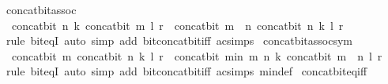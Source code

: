 \begin{isabellebody}
\isanewline
%
\endisadelimproof
\isanewline
{}\isamarkupfalse%
\ concat{\isacharunderscore}{\kern0pt}bit{\isacharunderscore}{\kern0pt}assoc{\isacharcolon}{\kern0pt}\isanewline
\ \ {\isacartoucheopen}concat{\isacharunderscore}{\kern0pt}bit\ n\ k\ {\isacharparenleft}{\kern0pt}concat{\isacharunderscore}{\kern0pt}bit\ m\ l\ r{\isacharparenright}{\kern0pt}\ {\isacharequal}{\kern0pt}\ concat{\isacharunderscore}{\kern0pt}bit\ {\isacharparenleft}{\kern0pt}m\ {\isacharplus}{\kern0pt}\ n{\isacharparenright}{\kern0pt}\ {\isacharparenleft}{\kern0pt}concat{\isacharunderscore}{\kern0pt}bit\ n\ k\ l{\isacharparenright}{\kern0pt}\ r{\isacartoucheclose}\isanewline
%
\isadelimproof
\ \ %
\endisadelimproof
%
\isatagproof
{}\isamarkupfalse%
\ {\isacharparenleft}{\kern0pt}rule\ bit{\isacharunderscore}{\kern0pt}eqI{\isacharparenright}{\kern0pt}\ {\isacharparenleft}{\kern0pt}auto\ simp\ add{\isacharcolon}{\kern0pt}\ bit{\isacharunderscore}{\kern0pt}concat{\isacharunderscore}{\kern0pt}bit{\isacharunderscore}{\kern0pt}iff\ ac{\isacharunderscore}{\kern0pt}simps{\isacharparenright}{\kern0pt}%
\endisatagproof
{\isafoldproof}%
%
\isadelimproof
\isanewline
%
\endisadelimproof
\isanewline
{}\isamarkupfalse%
\ concat{\isacharunderscore}{\kern0pt}bit{\isacharunderscore}{\kern0pt}assoc{\isacharunderscore}{\kern0pt}sym{\isacharcolon}{\kern0pt}\isanewline
\ \ {\isacartoucheopen}concat{\isacharunderscore}{\kern0pt}bit\ m\ {\isacharparenleft}{\kern0pt}concat{\isacharunderscore}{\kern0pt}bit\ n\ k\ l{\isacharparenright}{\kern0pt}\ r\ {\isacharequal}{\kern0pt}\ concat{\isacharunderscore}{\kern0pt}bit\ {\isacharparenleft}{\kern0pt}min\ m\ n{\isacharparenright}{\kern0pt}\ k\ {\isacharparenleft}{\kern0pt}concat{\isacharunderscore}{\kern0pt}bit\ {\isacharparenleft}{\kern0pt}m\ {\isacharminus}{\kern0pt}\ n{\isacharparenright}{\kern0pt}\ l\ r{\isacharparenright}{\kern0pt}{\isacartoucheclose}\isanewline
%
\isadelimproof
\ \ %
\endisadelimproof
%
\isatagproof
{}\isamarkupfalse%
\ {\isacharparenleft}{\kern0pt}rule\ bit{\isacharunderscore}{\kern0pt}eqI{\isacharparenright}{\kern0pt}\ {\isacharparenleft}{\kern0pt}auto\ simp\ add{\isacharcolon}{\kern0pt}\ bit{\isacharunderscore}{\kern0pt}concat{\isacharunderscore}{\kern0pt}bit{\isacharunderscore}{\kern0pt}iff\ ac{\isacharunderscore}{\kern0pt}simps\ min{\isacharunderscore}{\kern0pt}def{\isacharparenright}{\kern0pt}%
\endisatagproof
{\isafoldproof}%
%
\isadelimproof
\isanewline
%
\endisadelimproof
\isanewline
{}\isamarkupfalse%
\ concat{\isacharunderscore}{\kern0pt}bit{\isacharunderscore}{\kern0pt}eq{\isacharunderscore}{\kern0pt}iff{\isacharcolon}{\kern0pt}\isanewline

\end{isabellebody}

